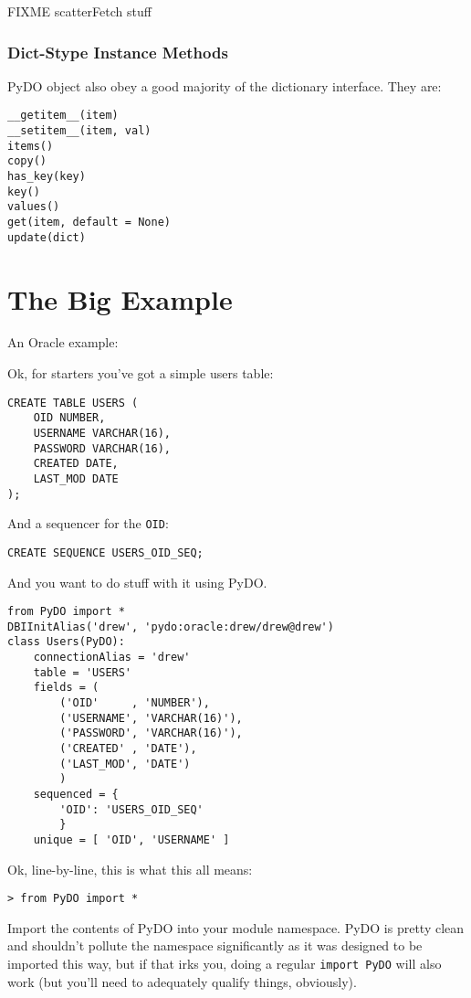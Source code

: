 \documentclass[titlepage]{manual}
\begin{document}
FIXME scatterFetch stuff

\subsection{Dict-Stype Instance Methods}
PyDO object also obey a good majority of the dictionary interface.
They are:
\begin{verbatim}
__getitem__(item)
__setitem__(item, val)
items()
copy()
has_key(key)
key()
values()
get(item, default = None)
update(dict)
\end{verbatim}


\chapter{The Big Example}
An Oracle example:

Ok, for starters you've got a simple users table:

\begin{verbatim}
CREATE TABLE USERS (
    OID NUMBER,
    USERNAME VARCHAR(16),
    PASSWORD VARCHAR(16),
    CREATED DATE,
    LAST_MOD DATE
);
\end{verbatim}

And a sequencer for the \texttt{OID}:

\begin{verbatim}
CREATE SEQUENCE USERS_OID_SEQ;
\end{verbatim}

And you want to do stuff with it using PyDO.

\begin{verbatim}
from PyDO import *
DBIInitAlias('drew', 'pydo:oracle:drew/drew@drew')
class Users(PyDO):
    connectionAlias = 'drew'
    table = 'USERS'
    fields = (
        ('OID'     , 'NUMBER'),
        ('USERNAME', 'VARCHAR(16)'),
        ('PASSWORD', 'VARCHAR(16)'),
        ('CREATED' , 'DATE'),
        ('LAST_MOD', 'DATE')
        )
    sequenced = {
        'OID': 'USERS_OID_SEQ'
        }
    unique = [ 'OID', 'USERNAME' ]
\end{verbatim}

Ok, line-by-line, this is what this all means:

\begin{verbatim}
> from PyDO import *
\end{verbatim}

Import the contents of PyDO into your module namespace.  PyDO is
pretty clean and shouldn't pollute the namespace significantly as it
was designed to be imported this way, but if that irks you, doing a
regular \texttt{import PyDO} will also work (but you'll need to
adequately qualify things, obviously).
\end{document}
